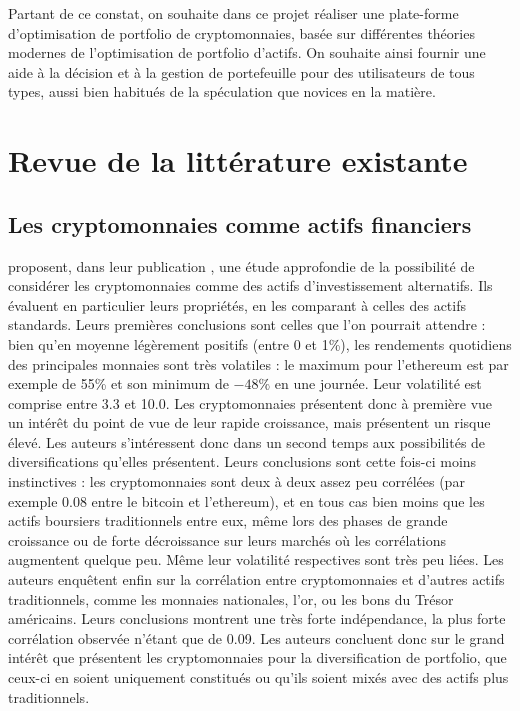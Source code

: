 \documentclass[a4paper]{article}
\begin{document}
Partant de ce constat, on souhaite dans ce projet réaliser une plate-forme d’optimisation de portfolio de cryptomonnaies, basée sur différentes théories modernes de l'optimisation de portfolio d'actifs. On souhaite ainsi fournir une aide à la décision et à la gestion de portefeuille pour des utilisateurs de tous types, aussi bien habitués de la spéculation que novices en la matière.

\section{Revue de la littérature existante}

\subsection{Les cryptomonnaies comme actifs financiers}

\textbf{\citet{Elendner2018}} proposent, dans leur publication \textbf{}, une étude approfondie de la possibilité de considérer les cryptomonnaies comme des actifs d'investissement alternatifs. Ils évaluent en particulier leurs propriétés, en les comparant à celles des actifs standards. Leurs premières conclusions sont celles que l'on pourrait attendre : bien qu'en moyenne légèrement positifs (entre 0 et 1\%), les rendements quotidiens des principales monnaies sont très volatiles : le maximum pour l'ethereum est par exemple de 55\% et son minimum de $-48\%$ en une journée. Leur volatilité est comprise entre 3.3 et 10.0. Les cryptomonnaies présentent donc à première vue un intérêt du point de vue de leur rapide croissance, mais présentent un risque élevé. Les auteurs s'intéressent donc dans un second temps aux possibilités de diversifications qu'elles présentent. Leurs conclusions sont cette fois-ci moins instinctives : les cryptomonnaies sont deux à deux assez peu corrélées (par exemple 0.08 entre le bitcoin et l'ethereum), et en tous cas bien moins que les actifs boursiers traditionnels entre eux, même lors des phases de grande croissance ou de forte décroissance sur leurs marchés où les corrélations augmentent quelque peu. Même leur volatilité respectives sont très peu liées. Les auteurs enquêtent enfin sur la corrélation entre cryptomonnaies et d'autres actifs traditionnels, comme les monnaies nationales, l'or, ou les bons du Trésor américains. Leurs conclusions montrent une très forte indépendance, la plus forte corrélation observée n'étant que de 0.09. Les auteurs concluent donc sur le grand intérêt que présentent les cryptomonnaies pour la diversification de portfolio, que ceux-ci en soient uniquement constitués ou qu'ils soient mixés avec des actifs plus traditionnels.
\end{document}
